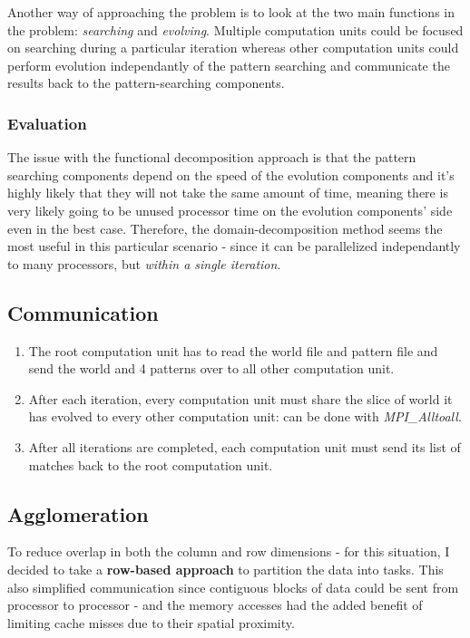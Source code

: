 \documentclass[12pt,a4paper]{article}
\begin{document}
Another way of approaching the problem is to look at the two main functions in the problem: \textit{searching} and \textit{evolving}. Multiple computation units could be focused on searching during a particular iteration whereas other computation units could perform evolution independantly of the pattern searching and communicate the results back to the pattern-searching components. 

\subsubsection{Evaluation}
The issue with the functional decomposition approach is that the pattern searching components depend on the speed of the evolution components and it's highly likely that they will not take the same amount of time, meaning there is very likely going to be unused processor time on the evolution components' side even in the best case. Therefore, the domain-decomposition method seems the most useful in this particular scenario - since it can be parallelized independantly to many processors, but \textit{within a single iteration}.

\newpage

\subsection{Communication}

\begin{enumerate}
\item{The root computation unit has to read the world file and pattern file and send the world and 4 patterns over to all other computation unit.}
\item{After each iteration, every computation unit must share the slice of world it has evolved to every other computation unit: can be done with \textit{MPI\_Alltoall}.}
\item{After all iterations are completed, each computation unit must send its list of matches back to the root computation unit.}
\end{enumerate}

\subsection{Agglomeration}
To reduce overlap in both the column and row dimensions - for this situation, I decided to take a \textbf{row-based approach} to partition the data into tasks. This also simplified communication since contiguous blocks of data could be sent from processor to processor - and the memory accesses had the added benefit of limiting cache misses due to their spatial proximity. \\
\end{document}
